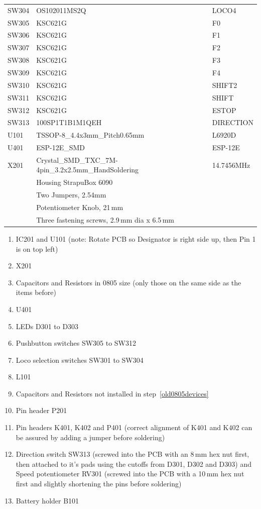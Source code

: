 \documentclass[11pt,a4paper]{scrartcl}
\begin{document}
\begin{table}
\begin{footnotesize}
\begin{tabular}{|m{5em}|l|l|}
    SW304 & OS102011MS2Q & LOCO4 \\
    SW305 & KSC621G & F0 \\
    SW306 & KSC621G & F1 \\
    SW307 & KSC621G & F2 \\
    SW308 & KSC621G & F3 \\
    SW309 & KSC621G & F4 \\
    SW310 & KSC621G & SHIFT2 \\
    SW311 & KSC621G & SHIFT \\
    SW312 & KSC621G & ESTOP \\
    SW313 & 100SP1T1B1M1QEH & DIRECTION \\
    U101 & TSSOP-8\_4.4x3mm\_Pitch0.65mm & L6920D \\
    U401 & ESP-12E\_SMD & ESP-12E \\
    X201 & Crystal\_SMD\_TXC\_7M-4pin\_3.2x2.5mm\_HandSoldering & 14.7456MHz \\
    \hline
    & Housing StrapuBox 6090 & \\
    & Two Jumpers, 2.54mm & \\
    & Potentiometer Knob, 21\,mm & \\
    & Three fastening screws, 2.9\,mm dia x 6.5\,mm \\
    \hline
  \end{tabular}
  \end{footnotesize}
\end{table}

\begin{enumerate}
\item IC201 and U101 (note: Rotate PCB so Designator is right side up, then Pin 1 is on top left)
\item X201
\item Capacitors and Resistors in 0805 size (only those on the same side as the items before) \label{old0805devices}
\item U401
\item LEDs D301 to D303
\item Pushbutton switches SW305 to SW312
\item Loco selection switches SW301 to SW304
\item L101
\item Capacitors and Resistors not installed in step~\ref{old0805devices}
\item Pin header P201
\item Pin headers K401, K402 and P401 (correct alignment of K401 and K402 can be assured by adding a jumper before soldering)
\item Direction switch SW313 (screwed into the PCB with an 8\,mm hex nut first, then attached to it's pads using the cutoffs from D301, D302 and D303) and Speed potentiometer RV301 (screwed into the PCB with a 10\,mm hex nut first and slightly shortening the pins before soldering)
\item Battery holder B101
\end{enumerate}
\end{document}

